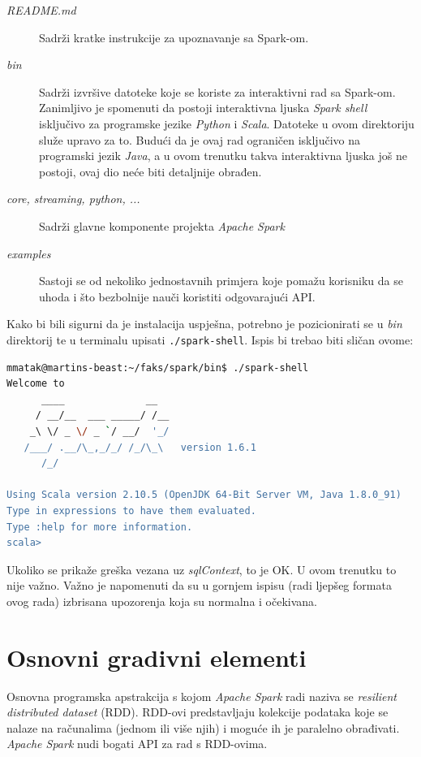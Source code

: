\documentclass[times, utf8, zavrsni]{fer}
\begin{document}
\begin{description}
\item[\emph{README.md} ]Sadrži kratke instrukcije za upoznavanje sa Spark-om.
\item[\emph{bin} ]Sadrži izvršive datoteke koje se koriste za interaktivni rad sa Spark-om.\\Zanimljivo je spomenuti da postoji interaktivna ljuska \emph{Spark shell} isključivo za programske jezike \emph{Python} i \emph{Scala}. Datoteke u ovom direktoriju služe upravo za to. Budući da je ovaj rad ograničen isključivo na programski jezik \emph{Java}, a u ovom trenutku takva interaktivna ljuska još ne postoji, ovaj dio neće biti detaljnije obrađen.
\item[\emph{core, streaming, python, ...} ]Sadrži glavne komponente projekta \emph{Apache Spark} 
\item[\emph{examples} ]Sastoji se od nekoliko jednostavnih primjera koje pomažu korisniku da se uhoda i što bezbolnije nauči koristiti odgovarajući API.
\end{description}

Kako bi bili sigurni da je instalacija uspješna, potrebno je pozicionirati se u \emph{bin} direktorij te u terminalu upisati \texttt{./spark-shell}. Ispis bi trebao biti sličan ovome:\\
\begin{lstlisting}[language=bash]
mmatak@martins-beast:~/faks/spark/bin$ ./spark-shell
Welcome to
      ____              __
     / __/__  ___ _____/ /__
    _\ \/ _ \/ _ `/ __/  '_/
   /___/ .__/\_,_/_/ /_/\_\   version 1.6.1
      /_/

Using Scala version 2.10.5 (OpenJDK 64-Bit Server VM, Java 1.8.0_91)
Type in expressions to have them evaluated.
Type :help for more information.
scala>
\end{lstlisting}


Ukoliko se prikaže greška vezana uz \emph{sqlContext}, to je OK. U ovom trenutku to nije važno. Važno je napomenuti da su u gornjem ispisu (radi ljepšeg formata ovog rada) izbrisana upozorenja  koja su normalna i očekivana.

\newpage
\section{Osnovni gradivni elementi}
Osnovna programska apstrakcija s kojom \emph{Apache Spark} radi naziva se \emph{resilient distributed dataset} (RDD). RDD-ovi predstavljaju kolekcije podataka koje se nalaze na računalima (jednom ili više njih) i moguće ih je paralelno obrađivati. \emph{Apache Spark} nudi bogati API za rad s RDD-ovima.
\end{document}
